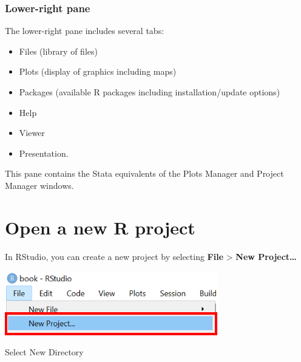 \documentclass[
  letterpaper,
  DIV=11,
  numbers=noendperiod]{scrreprt}
\providecommand{\tightlist}{%
  \setlength{\itemsep}{0pt}\setlength{\parskip}{0pt}}\usepackage{longtable,booktabs,array}
\begin{document}
\hypertarget{lower-right-pane}{%
\subsubsection{Lower-right pane}\label{lower-right-pane}}

The lower-right pane includes several tabs:

\begin{itemize}
\tightlist
\item
  Files (library of files)
\item
  Plots (display of graphics including maps)
\item
  Packages (available R packages including installation/update options)
\item
  Help
\item
  Viewer
\item
  Presentation.
\end{itemize}

\begin{tcolorbox}[enhanced jigsaw, colframe=quarto-callout-tip-color-frame, colback=white, rightrule=.15mm, bottomrule=.15mm, left=2mm, arc=.35mm, coltitle=black, title=\textcolor{quarto-callout-tip-color}{\faLightbulb}\hspace{0.5em}{Tip}, opacitybacktitle=0.6, bottomtitle=1mm, opacityback=0, toptitle=1mm, toprule=.15mm, colbacktitle=quarto-callout-tip-color!10!white, titlerule=0mm, leftrule=.75mm, breakable]
This pane contains the Stata equivalents of the Plots Manager and
Project Manager windows.
\end{tcolorbox}

\hypertarget{open-a-new-r-project}{%
\section{Open a new R project}\label{open-a-new-r-project}}

In RStudio, you can create a new project by selecting \textbf{File}
\textgreater{} \textbf{New Project\ldots{}}

\includegraphics[width=3.64583in,height=\textheight]{./images/paste-CCA1D5A5.png}

Select New Directory
\end{document}
